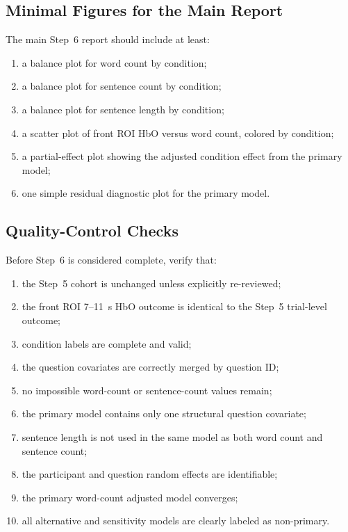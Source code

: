 \documentclass[11pt]{article}
\begin{document}
\subsection{Minimal Figures for the Main Report}
The main Step~6 report should include at least:
\begin{enumerate}
    \item a balance plot for word count by condition;
    \item a balance plot for sentence count by condition;
    \item a balance plot for sentence length by condition;
    \item a scatter plot of front ROI HbO versus word count, colored by condition;
    \item a partial-effect plot showing the adjusted condition effect from the primary model;
    \item one simple residual diagnostic plot for the primary model.
\end{enumerate}

\subsection{Quality-Control Checks}
Before Step~6 is considered complete, verify that:
\begin{enumerate}
    \item the Step~5 cohort is unchanged unless explicitly re-reviewed;
    \item the front ROI 7--11~s HbO outcome is identical to the Step~5 trial-level outcome;
    \item condition labels are complete and valid;
    \item the question covariates are correctly merged by question ID;
    \item no impossible word-count or sentence-count values remain;
    \item the primary model contains only one structural question covariate;
    \item sentence length is not used in the same model as both word count and sentence count;
    \item the participant and question random effects are identifiable;
    \item the primary word-count adjusted model converges;
    \item all alternative and sensitivity models are clearly labeled as non-primary.
\end{enumerate}
\end{document}
